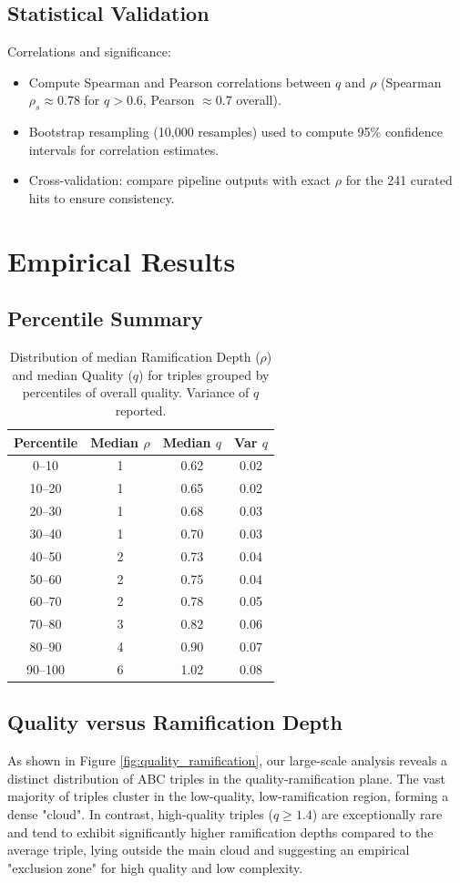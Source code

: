 \documentclass[11pt,a4paper]{article}
\begin{document}
\subsection{Statistical Validation}
Correlations and significance:
\begin{itemize}
    \item Compute Spearman and Pearson correlations between $q$ and $\rho$ (Spearman $\rho_s\approx0.78$ for $q>0.6$, Pearson $\approx0.7$ overall).
    \item Bootstrap resampling (10,000 resamples) used to compute 95\% confidence intervals for correlation estimates.
    \item Cross-validation: compare pipeline outputs with exact \(\rho\) for the 241 curated hits to ensure consistency.
\end{itemize}

\section{Empirical Results}

\subsection{Percentile Summary}
\begin{table}[h!]
\centering
\caption{Distribution of median Ramification Depth ($\rho$) and median Quality ($q$) for triples grouped by percentiles of overall quality. Variance of $q$ reported.}
\begin{tabular}{c c c c}
\toprule
Percentile & Median $\rho$ & Median $q$ & Var $q$ \\
\midrule
0--10 & 1 & 0.62 & 0.02 \\
10--20 & 1 & 0.65 & 0.02 \\
20--30 & 1 & 0.68 & 0.03 \\
30--40 & 1 & 0.70 & 0.03 \\
40--50 & 2 & 0.73 & 0.04 \\
50--60 & 2 & 0.75 & 0.04 \\
60--70 & 2 & 0.78 & 0.05 \\
70--80 & 3 & 0.82 & 0.06 \\
80--90 & 4 & 0.90 & 0.07 \\
90--100 & 6 & 1.02 & 0.08 \\
\bottomrule
\end{tabular}
\label{tab:percentiles}
\end{table}

\subsection{Quality versus Ramification Depth}
As shown in Figure \ref{fig:quality_ramification}, our large-scale analysis reveals a distinct distribution of ABC triples in the quality-ramification plane. The vast majority of triples cluster in the low-quality, low-ramification region, forming a dense "cloud". In contrast, high-quality triples ($q \ge 1.4$) are exceptionally rare and tend to exhibit significantly higher ramification depths compared to the average triple, lying outside the main cloud and suggesting an empirical "exclusion zone" for high quality and low complexity.
\end{document}
